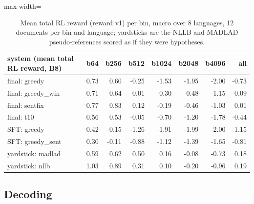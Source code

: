 \begin{table}[t]
\centering
\footnotesize
\setlength{\tabcolsep}{3pt}
\caption{Mean total RL reward (reward v1) per bin, macro over 8 languages, 12 documents per bin and language; yardsticks are the NLLB and MADLAD pseudo-references scored as if they were hypotheses.}
\label{tab:t_longdoc_reward}
\begin{adjustbox}{max width=\linewidth}
{\def\LTcaptype{none} %
\begin{tabular}{@{}lrrrrrrr@{}}
\toprule
system (mean total RL reward, B8) & b64 & b256 & b512 & b1024 & b2048 & b4096 & all \\
\midrule
final: greedy & 0.73 & 0.60 & -0.25 & -1.53 & -1.95 & -2.00 & -0.73 \\
final: greedy\_win & 0.71 & 0.64 & 0.01 & -0.30 & -0.48 & -1.15 & -0.09 \\
final: sentfix & 0.77 & 0.83 & 0.12 & -0.19 & -0.46 & -1.03 & 0.01 \\
final: t10 & 0.56 & 0.53 & -0.05 & -0.70 & -1.20 & -1.78 & -0.44 \\
SFT: greedy & 0.42 & -0.15 & -1.26 & -1.91 & -1.99 & -2.00 & -1.15 \\
SFT: greedy\_sent & 0.30 & -0.11 & -0.88 & -1.12 & -1.39 & -1.65 & -0.81 \\
yardstick: madlad & 0.59 & 0.62 & 0.50 & 0.16 & -0.08 & -0.73 & 0.18 \\
yardstick: nllb & 1.03 & 0.89 & 0.31 & 0.10 & -0.20 & -0.96 & 0.19 \\
\bottomrule
\end{tabular}
}
\end{adjustbox}
\end{table}

\subsection{Decoding}\label{decoding}

